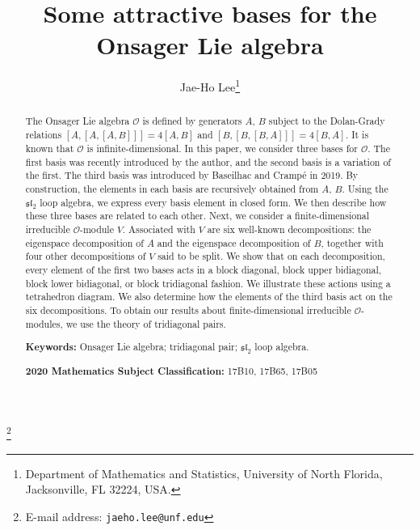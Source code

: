 \documentclass[11pt]{article}%
\theoremstyle{definition}
\theoremstyle{plain}
\begin{document}
\title{\bf Some attractive bases for the Onsager Lie algebra}




\author {
Jae-Ho Lee\thanks{Department of Mathematics and Statistics, University of North Florida, Jacksonville, FL 32224, USA.}
}
\date{}

\maketitle
\newcommand\blfootnote[1]{%
\begingroup
\renewcommand\thefootnote{}\footnote{#1}%
\addtocounter{footnote}{-1}%
\endgroup}
\blfootnote{E-mail address:  \texttt{jaeho.lee@unf.edu}}

\begin{abstract}
\noindent
The Onsager Lie algebra $\mathcal{O}$ is defined by generators $A$, $B$ subject to the Dolan-Grady relations $[A,[A,[A,B]]] = 4[A,B]$ and $[B,[B,[B,A]]] = 4[B,A]$. It is known that $\mathcal{O}$ is infinite-dimensional.
In this paper, we consider three bases for $\mathcal{O}$.
The first basis was recently introduced by the author, and the second basis is a variation of the first.
The third basis was introduced by Baseilhac and Cramp\'e in 2019.
By construction, the elements in each basis are recursively obtained from $A$, $B$. 
Using the $\mathfrak{sl}_2$ loop algebra, we express every basis element in closed form.
We then describe how these three bases are related to each other.
Next, we consider a finite-dimensional irreducible $\mathcal{O}$-module $V$.
Associated with $V$ are six well-known decompositions: the eigenspace decomposition of $A$ and the eigenspace decomposition of $B$, together with four other decompositions of $V$ said to be split.
We show that on each decomposition, every element of the first two bases acts in a block diagonal, block upper bidiagonal, block lower bidiagonal, or block tridiagonal fashion.
We illustrate these actions using a tetrahedron diagram.
We also determine how the elements of the third basis act on the six decompositions.
To obtain our results about finite-dimensional irreducible $\mathcal{O}$-modules, we use the theory of tridiagonal pairs.

\bigskip
\noindent
\textbf{Keywords:} Onsager Lie algebra; tridiagonal pair; $\mathfrak{sl}_2$ loop algebra.

\smallskip
\noindent 
\textbf{2020 Mathematics Subject Classification:} 17B10, 17B65, 17B05
\end{abstract}
\end{document}
